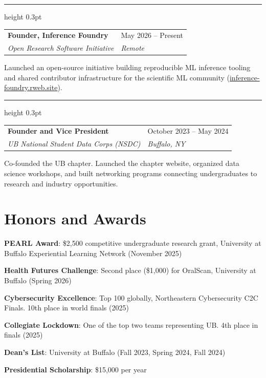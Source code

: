 \documentclass[11pt,a4paper]{article}
\makeatletter
\newcommand{\entrydivider}{%
  \vspace{4pt}%
  {\color{rulecolor}\hrule height 0.3pt}%
  \vspace{4pt}%
}
\newcommand{\roleentry}[4]{%
  \vspace{0.5em}%
  \begin{tabular*}{\textwidth}{@{\extracolsep{\fill}} ll}
    \textbf{#1} & #2 \\
    \textit{#3} & \textit{#4} \\
  \end{tabular*}%
  \vspace{0.15em}%
}
\makeatother
\begin{document}
\entrydivider

\roleentry{Founder, Inference Foundry}{May 2026 -- Present}{Open Research Software Initiative}{Remote}
\begin{cvlist}
  \item Launched an open-source initiative building reproducible ML inference tooling and shared contributor infrastructure for the scientific ML community (\href{https://inference-foundry.rweb.site}{inference-foundry.rweb.site}).
\end{cvlist}

\entrydivider

\roleentry{Founder and Vice President}{October 2023 -- May 2024}{UB National Student Data Corps (NSDC)}{Buffalo, NY}
\begin{cvlist}
  \item Co-founded the UB chapter. Launched the chapter website, organized data science workshops, and built networking programs connecting undergraduates to research and industry opportunities.
\end{cvlist}

\section*{Honors and Awards}
\begin{cvlist}
  \item \textbf{PEARL Award}: \$2,500 competitive undergraduate research grant, University at Buffalo Experiential Learning Network (November 2025)
  \item \textbf{Health Futures Challenge}: Second place (\$1,000) for OralScan, University at Buffalo (Spring 2026)
  \item \textbf{Cybersecurity Excellence}: Top 100 globally, Northeastern Cybersecurity C2C Finals. 10th place in world finals (2025)
  \item \textbf{Collegiate Lockdown}: One of the top two teams representing UB. 4th place in finals (2025)
  \item \textbf{Dean's List}: University at Buffalo (Fall 2023, Spring 2024, Fall 2024)
  \item \textbf{Presidential Scholarship}: \$15,000 per year
\end{cvlist}

\end{document}
